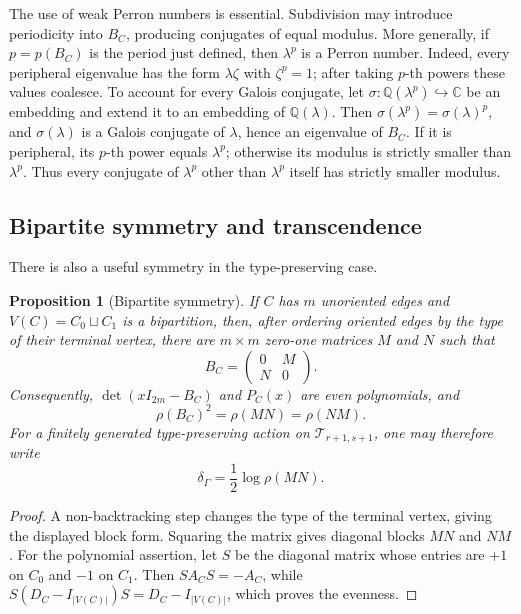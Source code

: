 \documentclass[11pt]{amsart}
\theoremstyle{plain}
\newtheorem{proposition}[theorem]{Proposition}
\theoremstyle{definition}
\theoremstyle{remark}
\newcommand{\T}{\mathcal T}
\begin{document}
The use of weak Perron numbers is essential.  Subdivision may introduce
periodicity into \(B_C\), producing conjugates of equal modulus.  More
generally, if \(p=p(B_C)\) is the period just defined, then \(\lambda^p\) is a
Perron number.  Indeed, every peripheral eigenvalue has the form
\(\lambda\zeta\) with \(\zeta^p=1\); after taking \(p\)-th powers these values
coalesce.  To account for every Galois conjugate, let
\(\sigma:\mathbb Q(\lambda^p)\hookrightarrow\mathbb C\) be an embedding and
extend it to an embedding of \(\mathbb Q(\lambda)\).  Then
\(\sigma(\lambda^p)=\sigma(\lambda)^p\), and \(\sigma(\lambda)\) is a Galois
conjugate of \(\lambda\), hence an eigenvalue of \(B_C\).  If it is
peripheral, its \(p\)-th power equals \(\lambda^p\); otherwise its modulus is
strictly smaller than \(\lambda^p\).  Thus every conjugate of \(\lambda^p\)
other than \(\lambda^p\) itself has strictly smaller modulus.

\subsection{Bipartite symmetry and transcendence}

There is also a useful symmetry in the type-preserving case.

\begin{proposition}[Bipartite symmetry]\label{prop:bipartite-symmetry}
If \(C\) has \(m\) unoriented edges and
\(V(C)=C_0\sqcup C_1\) is a bipartition, then, after ordering oriented edges
by the type of their terminal vertex, there are \(m\times m\) zero-one
matrices \(M\) and \(N\) such that
\[
  B_C=\begin{pmatrix}0&M\\N&0\end{pmatrix}.
\]
Consequently, \(\det(xI_{2m}-B_C)\) and \(P_C(x)\) are even polynomials, and
\[
  \rho(B_C)^2=\rho(MN)=\rho(NM).
\]
For a finitely generated type-preserving action on
\(\T_{r+1,s+1}\), one may therefore write
\[
  \delta_\Gamma
  =\frac12\log\rho(MN).
\]
\end{proposition}

\begin{proof}
A non-backtracking step changes the type of the terminal vertex, giving the
displayed block form.  Squaring the matrix gives diagonal blocks \(MN\) and
\(NM\).  For the polynomial assertion, let \(S\) be the diagonal matrix
whose entries are \(+1\) on \(C_0\) and \(-1\) on \(C_1\).  Then
\(S A_C S=-A_C\), while
\(S(D_C-I_{|V(C)|})S=D_C-I_{|V(C)|}\), which proves the evenness.
\end{proof}
\end{document}

